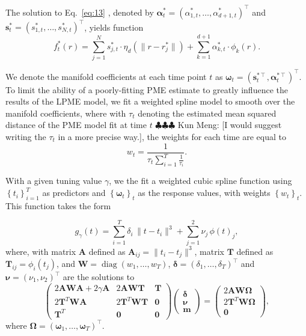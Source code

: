 \documentclass[11pt,reqno]{article}
\newcommand{\T}{\intercal}
\newcommand{\meng}[1]{{\color{purple} \sf $\clubsuit\clubsuit\clubsuit$ Kun Meng: [#1]}}
\theoremstyle{definition}
\begin{document}
The solution to Eq.~\eqref{eq:13} , denoted by $\boldsymbol{\alpha}^*_t=(\alpha^*_{1,t},\ldots,\alpha^*_{d+1,t})^\T$ and $\boldsymbol{s}^*_t=(s^*_{1,t},\ldots,s^*_{N,t})^\T$, yields function
\begin{equation}
  f_t^*(r) = \sum_{j=1}^{N}s_{j,t}^* \cdot  \eta_{d}\left(\|r - r_j^*\|\right) + \sum_{k=1}^{d + 1}\alpha_{k,t}^* \cdot \phi_k(r). \label{eq:14}
\end{equation}

We denote the manifold coefficients at each time point $t$ as $\boldsymbol{\omega}_t = (\boldsymbol{s}_t^{*\T}, \boldsymbol{\alpha}_t^{*\T})^\T$. To limit the ability of a poorly-fitting PME estimate to greatly influence the results of the LPME model, we fit a weighted spline model to smooth over the manifold coefficients, where with $\tau_t$ denoting the estimated mean squared distance of the PME model fit at time $t$ \meng{I would suggest writing the $\tau_t$ in a more precise way.}, the weights for each time are equal to 
$$w_t = \frac{1}{\tau_t\sum_{i=1}^{T}\frac{1}{\tau_i}}.$$ 

With a given tuning value $\gamma$, we the fit a weighted cubic spline function using $\left\{t_i\right\}_{i=1}^T$ as predictors and $\left\{\mathbf{\omega}_t\right\}_t$ as the response values, with weights $\left\{w_t\right\}_t$. This function takes the form

\begin{equation}
  g_{\gamma}(t) = \sum_{i=1}^{T}\delta_i \,\|t - t_i\|^{3} + \sum_{j=1}^{2}\nu_j\,\phi(t)_j, \label{eq:15}
\end{equation}
where, with matrix $\boldsymbol{A}$ defined as $\boldsymbol{A}_{ij} = \|t_i - t_j\|^{3}$, matrix $\boldsymbol{T}$ defined as $\boldsymbol{T}_{ij} = \phi_i(t_j)$, and $\boldsymbol{W} = \operatorname{diag}(w_1, \dots, w_T)$,  $\boldsymbol{\delta}=(\delta_1,\ldots,\delta_T)^\T$ and $\boldsymbol{\nu}=(\nu_1,\nu_2)^\T$ are the solutions to 
\begin{equation}
  \left(
  \begin{array}{ccc}
    2\boldsymbol{A}\boldsymbol{W}\boldsymbol{A} + 2\gamma\boldsymbol{A} & 2\boldsymbol{A}\boldsymbol{W}\boldsymbol{T} & \boldsymbol{T} \\
    2\boldsymbol{T}^{T}\boldsymbol{W}\boldsymbol{A} & 2\boldsymbol{T}^{T}\boldsymbol{W}\boldsymbol{T} & \boldsymbol{0} \\
    \boldsymbol{T}^{T} & \boldsymbol{0} & \boldsymbol{0}
  \end{array}
  \right)\left(
  \begin{array}{c}
    \boldsymbol{\delta} \\
    \boldsymbol{\nu} \\
    \boldsymbol{m}
  \end{array}
  \right) = \left(
  \begin{array}{c}
    2\boldsymbol{A}\boldsymbol{W}\boldsymbol{\Omega} \\
    2\boldsymbol{T}^{T}\boldsymbol{W}\boldsymbol{\Omega} \\
    \boldsymbol{0}
  \end{array}
  \right), \label{eq:16}
\end{equation}
where $\boldsymbol{\Omega}=(\boldsymbol{\omega}_1,\ldots, \boldsymbol{\omega}_T)^\T$.
\end{document}
